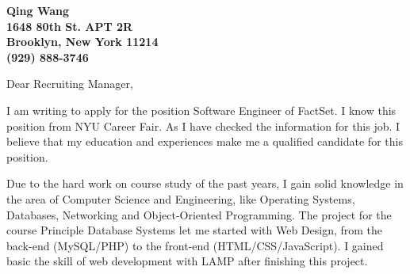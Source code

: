 \documentclass[11pt]{letter} %
\begin{document}

\begin{letter}{}


\begin{center}
\large\bf Qing Wang \\ %
1648 80th St. APT 2R \\ Brooklyn, New York 11214 \\ (929) 888-3746 %
\end{center} 
\vfill

\signature{Qing Wang} %


\opening{Dear Recruiting Manager,} 
 
I am writing to apply for the position Software Engineer of FactSet. I know this position from NYU Career Fair. As I have checked the information for this job. I believe that my education and experiences make me a qualified candidate for this position.

Due to the hard work on course study of the past years, I gain solid knowledge in the area of Computer Science and Engineering, like Operating Systems, Databases, Networking and Object-Oriented Programming. The project for the course Principle Database Systems let me started with Web Design, from the back-end (MySQL/PHP) to the front-end (HTML/CSS/JavaScript). I gained basic the skill of web development with LAMP after finishing this project.


\end{letter}
\end{document}
